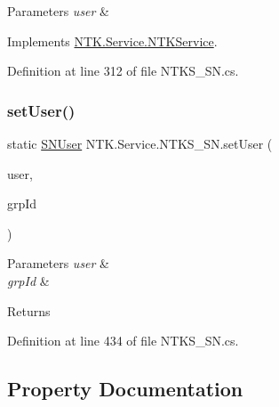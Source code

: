\begin{DoxyParams}{Parameters}
{\em user} & \\
\hline
\end{DoxyParams}


Implements \mbox{\hyperlink{class_n_t_k_1_1_service_1_1_n_t_k_service_a7c7cb8c5ddc57bebe6d9784744c976d7}{N\+T\+K.\+Service.\+N\+T\+K\+Service}}.



Definition at line 312 of file N\+T\+K\+S\+\_\+\+S\+N.\+cs.

\mbox{\label{class_n_t_k_1_1_service_1_1_n_t_k_s___s_n_a6024241f2a1ce46ad6c2b6d6f1aef140}} 
\subsubsection{\texorpdfstring{setUser()}{setUser()}}
{\footnotesize\ttfamily static \mbox{\hyperlink{class_n_t_k_1_1_service_1_1_s_n_user}{S\+N\+User}} N\+T\+K.\+Service.\+N\+T\+K\+S\+\_\+\+S\+N.\+set\+User (\begin{DoxyParamCaption}\item[{\mbox{\hyperlink{class_n_t_k_1_1_n_t_k_user}{N\+T\+K\+User}}}]{user,  }\item[{int}]{grp\+Id }\end{DoxyParamCaption})\hspace{0.3cm}{\ttfamily [static]}}






\begin{DoxyParams}{Parameters}
{\em user} & \\
\hline
{\em grp\+Id} & \\
\hline
\end{DoxyParams}
\begin{DoxyReturn}{Returns}

\end{DoxyReturn}


Definition at line 434 of file N\+T\+K\+S\+\_\+\+S\+N.\+cs.



\subsection{Property Documentation}
\mbox{\label{class_n_t_k_1_1_service_1_1_n_t_k_s___s_n_afb22d20b99934187701c3fd81da89583}} 
